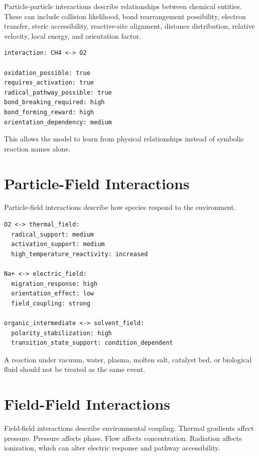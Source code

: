 \documentclass[11pt]{article}
\begin{document}
Particle-particle interactions describe relationships between chemical entities. These can include collision likelihood, bond rearrangement possibility, electron transfer, steric accessibility, reactive-site alignment, distance distribution, relative velocity, local energy, and orientation factor.

\begin{lstlisting}[caption={Example particle-particle feature packet}]
interaction: CH4 <-> O2

oxidation_possible: true
requires_activation: true
radical_pathway_possible: true
bond_breaking_required: high
bond_forming_reward: high
orientation_dependency: medium
\end{lstlisting}

This allows the model to learn from physical relationships instead of symbolic reaction names alone.

\section{Particle-Field Interactions}

Particle-field interactions describe how species respond to the environment.

\begin{lstlisting}[caption={Particle-field examples}]
O2 <-> thermal_field:
  radical_support: medium
  activation_support: medium
  high_temperature_reactivity: increased

Na+ <-> electric_field:
  migration_response: high
  orientation_effect: low
  field_coupling: strong

organic_intermediate <-> solvent_field:
  polarity_stabilization: high
  transition_state_support: condition_dependent
\end{lstlisting}

A reaction under vacuum, water, plasma, molten salt, catalyst bed, or biological fluid should not be treated as the same event.

\section{Field-Field Interactions}

Field-field interactions describe environmental coupling. Thermal gradients affect pressure. Pressure affects phase. Flow affects concentration. Radiation affects ionization, which can alter electric response and pathway accessibility.
\end{document}
